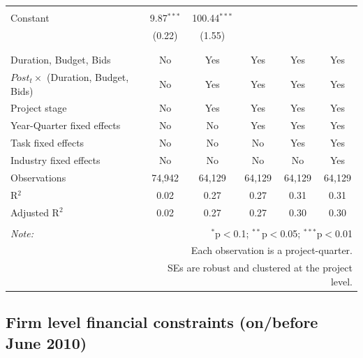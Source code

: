 \documentclass[
]{article}
\begin{document}
\begin{table}[H]
\begin{tabular}{@{\extracolsep{-2pt}}lccccc}
  & & & & & \\ 
 Constant & 9.87$^{***}$ & 100.44$^{***}$ &  &  &  \\ 
  & (0.22) & (1.55) &  &  &  \\ 
  & & & & & \\ 
\hline \\[-1.8ex] 
Duration, Budget, Bids & No & Yes & Yes & Yes & Yes \\ 
$Post_t \times $  (Duration, Budget, Bids) & No & Yes & Yes & Yes & Yes \\ 
Project stage & No & Yes & Yes & Yes & Yes \\ 
Year-Quarter fixed effects & No & No & Yes & Yes & Yes \\ 
Task fixed effects & No & No & No & Yes & Yes \\ 
Industry fixed effects & No & No & No & No & Yes \\ 
Observations & 74,942 & 64,129 & 64,129 & 64,129 & 64,129 \\ 
R$^{2}$ & 0.02 & 0.27 & 0.27 & 0.31 & 0.31 \\ 
Adjusted R$^{2}$ & 0.02 & 0.27 & 0.27 & 0.30 & 0.30 \\ 
\hline 
\hline \\[-1.8ex] 
\textit{Note:}  & \multicolumn{5}{r}{$^{*}$p$<$0.1; $^{**}$p$<$0.05; $^{***}$p$<$0.01} \\ 
 & \multicolumn{5}{r}{Each observation is a project-quarter.} \\ 
 & \multicolumn{5}{r}{SEs are robust and clustered at the project level.} \\ 
\end{tabular} 
\end{table}

\hypertarget{firm-level-financial-constraints-onbefore-june-2010-1}{%
\subsection{Firm level financial constraints (on/before June
2010)}\label{firm-level-financial-constraints-onbefore-june-2010-1}}
\end{document}
